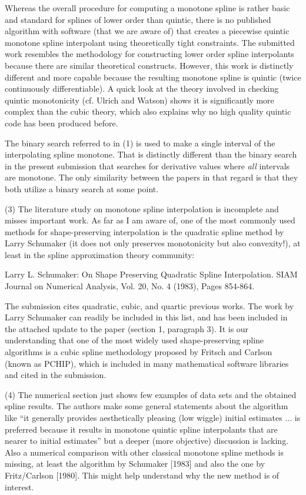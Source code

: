 Whereas the overall procedure for computing a monotone spline is rather basic and standard for splines of lower order than quintic, there is no published algorithm with software (that we are aware of) that creates a piecewise quintic monotone spline interpolant using theoretically tight constraints. The submitted work resembles the methodology for constructing lower order spline interpolants because there are similar theoretical constructs. However, this work is distinctly different and more capable because the resulting monotone spline is quintic (twice continuously differentiable). A quick look at the theory involved in checking quintic monotonicity (cf. Ulrich and Watson) shows it is significantly more complex than the cubic theory, which also explains why no high quality quintic code has been produced before.

The binary search referred to in (1) is used to make a single interval of the interpolating spline monotone. That is distinctly different than the binary search in the present submission that searches for derivative values where {\it all} intervals are monotone. The only similarity between the papers in that regard is that they both utilize a binary search at some point.

{\parindent=20pt \it

\item{(3)} The literature study on monotone spline interpolation is incomplete and misses important work. As far as I am aware of, one of the most commonly used methods for shape-preserving interpolation is the quadratic spline method by Larry Schumaker (it does not only preserves monotonicity but also convexity!), at least in the spline approximation theory community:

\itemitem{} Larry L. Schumaker: On Shape Preserving Quadratic Spline Interpolation. SIAM Journal on Numerical Analysis, Vol. 20, No. 4 (1983), Pages 854-864.

}

The submission cites quadratic, cubic, and quartic previous works. The work by Larry Schumaker can readily be included in this list, and has been included in the attached update to the paper (section 1, paragraph 3). It is our understanding that one of the most widely used shape-preserving spline algorithms is a cubic spline methodology proposed by Fritsch and Carlson (known as PCHIP), which is included in many mathematical software libraries and cited in the submission. 

{\parindent=20pt \it

\item{(4)} The numerical section just shows few examples of data sets and the obtained spline results. The authors make some general statements about the algorithm like ``it generally provides aesthetically pleasing (low wiggle) initial estimates ... is preferred because it results in monotone quintic spline interpolants that are nearer to initial estimates'' but a deeper (more objective) discussion is lacking. Also a numerical comparison with other classical monotone spline methods is missing, at least the algorithm by Schumaker [1983] and also the one by Fritz/Carlson [1980]. This might help understand why the new method is of interest.

}

